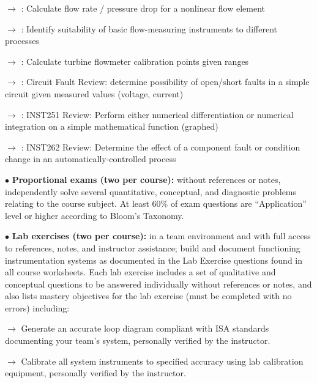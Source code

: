 \item\item{$\rightarrow$} : Calculate flow rate / pressure drop for a nonlinear flow element %
\item\item{$\rightarrow$} : Identify suitability of basic flow-measuring instruments to different processes %
\item\item{$\rightarrow$} : Calculate turbine flowmeter calibration points given ranges %
\item\item{$\rightarrow$} : Circuit Fault Review: determine possibility of open/short faults in a simple circuit given measured values (voltage, current) %
\item\item{$\rightarrow$} : INST251 Review: Perform either numerical differentiation or numerical integration on a simple mathematical function (graphed)
\item\item{$\rightarrow$} : INST262 Review: Determine the effect of a component fault or condition change in an automatically-controlled process
\vskip 5pt
\item{$\bullet$} {\bf Proportional exams (two per course):} without references or notes, independently solve several quantitative, conceptual, and diagnostic problems relating to the course subject.  At least 60\% of exam questions are ``Application'' level or higher according to Bloom's Taxonomy.
\vskip 5pt
\item{$\bullet$} {\bf Lab exercises (two per course):} in a team environment and with full access to references, notes, and instructor assistance; build and document functioning instrumentation systems as documented in the Lab Exercise questions found in all course worksheets.  Each lab exercise includes a set of qualitative and conceptual questions to be answered individually without references or notes, and also lists mastery objectives for the lab exercise (must be completed with no errors) including:
\item\item{$\rightarrow$} Generate an accurate loop diagram compliant with ISA standards documenting your team's system, personally verified by the instructor.
\item\item{$\rightarrow$} Calibrate all system instruments to specified accuracy using lab calibration equipment, personally verified by the instructor.
